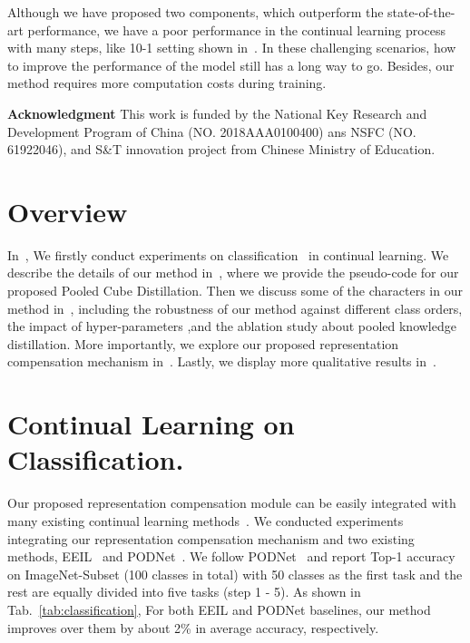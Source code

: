 \documentclass[10pt,twocolumn,letterpaper]{article}
\begin{document}
Although we have proposed two components, which outperform the state-of-the-art performance,
we have a poor performance in the continual learning process with many steps, like 10-1 setting shown in~.
In these challenging scenarios,
how to improve the performance of the model still has a long way to go.
Besides,
our method requires more computation costs during training.


\textbf{Acknowledgment}
This work is funded by the National Key Research and Development Program of China (NO. 2018AAA0100400) ans NSFC (NO. 61922046), and S\&T innovation project from Chinese Ministry of Education.











{\small


}

\clearpage

\appendix
\section{Overview}
In~,
We firstly conduct experiments on classification~\cite{wu2019large,douillard2020podnet} in continual learning.
We describe the details of our method in~,
where we provide the pseudo-code for our proposed Pooled Cube Distillation.
Then we discuss some of the characters in our method in~,
including the robustness of our method against different class orders,
the impact of hyper-parameters  ,and
the ablation study about pooled knowledge distillation.
More importantly,
we explore our proposed representation compensation mechanism in~.
Lastly,
we display more qualitative results in~.



\section{Continual Learning on Classification.}\label{sec:rconcls}
Our proposed representation compensation module can be easily integrated with many existing continual learning methods~\cite{wu2019large,douillard2020podnet,ahn2021ss}.
We conducted experiments integrating our representation compensation mechanism and two existing methods, EEIL~\cite{wu2019large} and PODNet~\cite{douillard2020podnet}.
We follow PODNet~\cite{douillard2020podnet} and report Top-1 accuracy on ImageNet-Subset (100 classes in total) with 50 classes as the first task and the rest are equally divided into five tasks (step 1 - 5).
As shown in Tab.~\ref{tab:classification}, For both EEIL and PODNet baselines, our method improves over them by about 2\% in average accuracy, respectively. 
\end{document}

